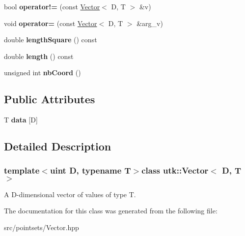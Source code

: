 \begin{DoxyCompactItemize}
\item 
\hypertarget{classutk_1_1Vector_abeef808ef700ab49a4323485a178eeed}{bool {\bfseries operator!=} (const \hyperlink{classutk_1_1Vector}{Vector}$<$ D, T $>$ \&v)}\label{classutk_1_1Vector_abeef808ef700ab49a4323485a178eeed}

\item 
\hypertarget{classutk_1_1Vector_abcc8ed414ad75a2696763d5c1bde11d2}{void {\bfseries operator=} (const \hyperlink{classutk_1_1Vector}{Vector}$<$ D, T $>$ \&arg\-\_\-v)}\label{classutk_1_1Vector_abcc8ed414ad75a2696763d5c1bde11d2}

\item 
\hypertarget{classutk_1_1Vector_a4a3fa93c76946b4a8a373377e5381d54}{double {\bfseries length\-Square} () const }\label{classutk_1_1Vector_a4a3fa93c76946b4a8a373377e5381d54}

\item 
\hypertarget{classutk_1_1Vector_adbe9844cf6fb801b9ce6d2a27a82b167}{double {\bfseries length} () const }\label{classutk_1_1Vector_adbe9844cf6fb801b9ce6d2a27a82b167}

\item 
\hypertarget{classutk_1_1Vector_ac585d9dc035cc5993980c19777b01235}{unsigned int {\bfseries nb\-Coord} ()}\label{classutk_1_1Vector_ac585d9dc035cc5993980c19777b01235}

\end{DoxyCompactItemize}
\subsection*{Public Attributes}
\begin{DoxyCompactItemize}
\item 
\hypertarget{classutk_1_1Vector_a03999540f5928420c3dd36898313b546}{T {\bfseries data} \mbox{[}D\mbox{]}}\label{classutk_1_1Vector_a03999540f5928420c3dd36898313b546}

\end{DoxyCompactItemize}


\subsection{Detailed Description}
\subsubsection*{template$<$uint D, typename T$>$class utk\-::\-Vector$<$ D, T $>$}

A D-\/dimensional vector of values of type T. 

The documentation for this class was generated from the following file\-:\begin{DoxyCompactItemize}
\item 
src/pointsets/Vector.\-hpp\end{DoxyCompactItemize}

